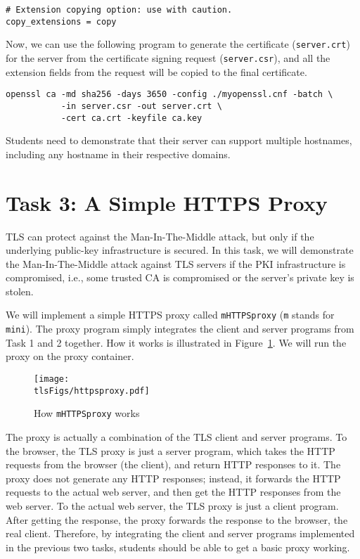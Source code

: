\begin{lstlisting}
# Extension copying option: use with caution.
copy_extensions = copy
\end{lstlisting}


Now, we can use the following program to generate the certificate (\texttt{server.crt}) 
for the server from the certificate signing request (\texttt{server.csr}), and 
all the extension fields from the request will be copied to the final certificate.

\begin{lstlisting}
openssl ca -md sha256 -days 3650 -config ./myopenssl.cnf -batch \
           -in server.csr -out server.crt \
           -cert ca.crt -keyfile ca.key
\end{lstlisting}


Students need to demonstrate that their server can support multiple hostnames, including 
any hostname in their respective domains.



\section{Task 3: A Simple HTTPS Proxy}

TLS can protect against the Man-In-The-Middle attack, but only
if the underlying public-key infrastructure is secured. 
In this task, we will demonstrate the Man-In-The-Middle
attack against TLS servers if the PKI infrastructure is 
compromised, i.e., some trusted CA is compromised or 
the server's private key is stolen. 


We will implement a simple HTTPS proxy 
called \texttt{mHTTPSproxy} (\texttt{m} stands
for \texttt{mini}). The proxy program simply
integrates the client and server programs from Task 1 and 
2 together. How it works is illustrated in Figure~\ref{tls:fig:proxy}. 
We will run the proxy on the proxy container. 


\begin{figure}[htb]
\begin{center}
\texttt{[image: \\tlsFigs/httpsproxy.pdf]}
\end{center}
\caption{How \texttt{mHTTPSproxy} works}
\label{tls:fig:proxy}
\end{figure}

The proxy is actually a combination of the TLS client and server programs.
To the browser, the TLS proxy is just a server program, which takes 
the HTTP requests from the browser (the client), and return HTTP
responses to it. The proxy does not generate any HTTP responses; instead,
it forwards the HTTP requests to the actual web server, and then 
get the HTTP responses from the web server. To the actual web server,
the TLS proxy is just a client program. After getting the response,
the proxy forwards the response to the browser, the real client. 
Therefore, by integrating the client and server programs implemented
in the previous two tasks, students should be able to get a basic 
proxy working. 


